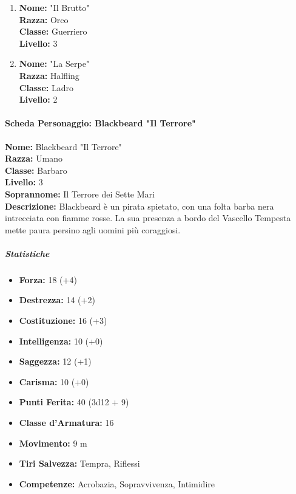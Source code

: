 \documentclass{article}
\begin{document}
\begin{enumerate}
\item \textbf{Nome:} "Il Brutto"\\
  \textbf{Razza:} Orco\\
  \textbf{Classe:} Guerriero\\
  \textbf{Livello:} 3

\item \textbf{Nome:} "La Serpe"\\
  \textbf{Razza:} Halfling\\
  \textbf{Classe:} Ladro\\
  \textbf{Livello:} 2

\end {enumerate}



\paragraph*{Scheda Personaggio: Blackbeard "Il Terrore"}

\textbf{Nome:} Blackbeard "Il Terrore" \\
\textbf{Razza:} Umano \\
\textbf{Classe:} Barbaro \\
\textbf{Livello:} 3 \\
\textbf{Soprannome:} Il Terrore dei Sette Mari \\
\textbf{Descrizione:} Blackbeard è un pirata spietato, con una folta barba nera intrecciata con fiamme rosse. La sua presenza a bordo del Vascello Tempesta mette paura persino agli uomini più coraggiosi. 

\subparagraph*{Statistiche}

\begin{itemize}
  \item \textbf{Forza:} 18 (+4)
  \item \textbf{Destrezza:} 14 (+2)
  \item \textbf{Costituzione:} 16 (+3)
  \item \textbf{Intelligenza:} 10 (+0)
  \item \textbf{Saggezza:} 12 (+1)
  \item \textbf{Carisma:} 10 (+0)
\end{itemize}

\begin{itemize}
  \item \textbf{Punti Ferita:} 40 (3d12 + 9)
  \item \textbf{Classe d'Armatura:} 16
  \item \textbf{Movimento:} 9 m
  \item \textbf{Tiri Salvezza:} Tempra, Riflessi
  \item \textbf{Competenze:} Acrobazia, Sopravvivenza, Intimidire
\end{itemize}
\end{document}
